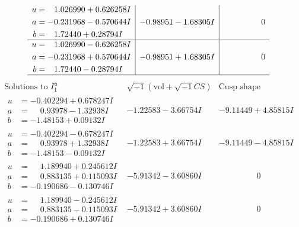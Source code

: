 \documentclass[1p]{elsarticle_modified}
\theoremstyle{definition}
\newcommand{\I}{\sqrt{-1}}
\begin{document}
$$\begin{array}{c|c|c}
\begin{aligned}
u &= \phantom{-}1.026990 + 0.626258 I \\
a &= -0.231968 - 0.570644 I \\
b &= \phantom{-}1.72440 + 0.28794 I\end{aligned}
 & -0.98951 - 1.68305 I & \phantom{-0.000000 } 0 \\ \hline\begin{aligned}
u &= \phantom{-}1.026990 - 0.626258 I \\
a &= -0.231968 + 0.570644 I \\
b &= \phantom{-}1.72440 - 0.28794 I\end{aligned}
 & -0.98951 + 1.68305 I & \phantom{-0.000000 } 0\\
 \hline 
 \end{array}$$\newpage$$\begin{array}{c|c|c}  
\text{Solutions to }I^u_{1}& \I (\text{vol} + \sqrt{-1}CS) & \text{Cusp shape}\\
 \hline 
\begin{aligned}
u &= -0.402294 + 0.678247 I \\
a &= \phantom{-}0.93978 - 1.32938 I \\
b &= -1.48153 + 0.09132 I\end{aligned}
 & -1.22583 - 3.66754 I & -9.11449 + 4.85815 I \\ \hline\begin{aligned}
u &= -0.402294 - 0.678247 I \\
a &= \phantom{-}0.93978 + 1.32938 I \\
b &= -1.48153 - 0.09132 I\end{aligned}
 & -1.22583 + 3.66754 I & -9.11449 - 4.85815 I \\ \hline\begin{aligned}
u &= \phantom{-}1.189940 + 0.245612 I \\
a &= \phantom{-}0.883135 + 0.115093 I \\
b &= -0.190686 - 0.130746 I\end{aligned}
 & -5.91342 - 3.60860 I & \phantom{-0.000000 } 0 \\ \hline\begin{aligned}
u &= \phantom{-}1.189940 - 0.245612 I \\
a &= \phantom{-}0.883135 - 0.115093 I \\
b &= -0.190686 + 0.130746 I\end{aligned}
 & -5.91342 + 3.60860 I & \phantom{-0.000000 } 0 \\ \hline\begin{aligned}

\end{aligned}
\end{array}$$
\end{document}
